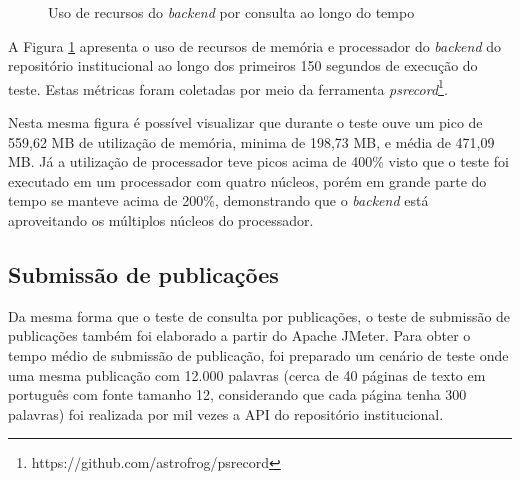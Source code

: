 \begin{figure}[H]
    \caption{Uso de recursos do \emph{backend} por consulta ao longo do tempo}
    \centering
    \label{fig:resource-usage-advanced-search}
\end{figure}

A Figura \ref{fig:resource-usage-advanced-search} apresenta o uso de recursos
de memória e processador do \emph{backend} do repositório institucional ao longo
dos primeiros 150 segundos de execução do teste. Estas métricas foram coletadas por
meio da ferramenta \emph{psrecord}\footnote{https://github.com/astrofrog/psrecord}.

Nesta mesma figura é possível visualizar que durante o teste ouve um pico de 559,62 MB
de utilização de memória, minima de 198,73 MB, e média de 471,09 MB. Já a utilização de
processador teve picos acima de 400\% visto que o teste foi executado em um
processador com quatro núcleos, porém em grande parte do tempo se manteve acima de 200\%,
demonstrando que o \emph{backend} está aproveitando os múltiplos núcleos do processador.

\subsection{Submissão de publicações}

Da mesma forma que o teste de consulta por publicações, o teste de submissão de
publicações também foi elaborado a partir do Apache JMeter. Para obter o tempo médio
de submissão de publicação, foi preparado um cenário de teste onde uma mesma publicação
com 12.000 palavras (cerca de 40 páginas de texto em português com fonte tamanho 12,
considerando que cada página tenha 300 palavras) foi realizada por mil vezes a API do
repositório institucional.


